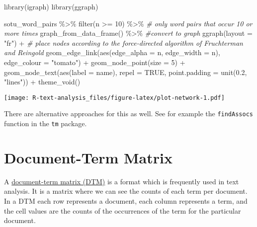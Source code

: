 \documentclass[
]{book}
\newenvironment{Shaded}{\begin{snugshade}}{\end{snugshade}}
\newcommand{\AttributeTok}[1]{\textcolor[rgb]{0.77,0.63,0.00}{#1}}
\newcommand{\CommentTok}[1]{\textcolor[rgb]{0.56,0.35,0.01}{\textit{#1}}}
\newcommand{\ConstantTok}[1]{\textcolor[rgb]{0.00,0.00,0.00}{#1}}
\newcommand{\DecValTok}[1]{\textcolor[rgb]{0.00,0.00,0.81}{#1}}
\newcommand{\FloatTok}[1]{\textcolor[rgb]{0.00,0.00,0.81}{#1}}
\newcommand{\FunctionTok}[1]{\textcolor[rgb]{0.00,0.00,0.00}{#1}}
\newcommand{\NormalTok}[1]{#1}
\newcommand{\SpecialCharTok}[1]{\textcolor[rgb]{0.00,0.00,0.00}{#1}}
\newcommand{\StringTok}[1]{\textcolor[rgb]{0.31,0.60,0.02}{#1}}
\begin{document}
\begin{Shaded}
\begin{Highlighting}[]
\FunctionTok{library}\NormalTok{(igraph)}
\FunctionTok{library}\NormalTok{(ggraph)}

\NormalTok{sotu\_word\_pairs }\SpecialCharTok{\%\textgreater{}\%} 
  \FunctionTok{filter}\NormalTok{(n }\SpecialCharTok{\textgreater{}=} \DecValTok{10}\NormalTok{) }\SpecialCharTok{\%\textgreater{}\%}  \CommentTok{\# only word pairs that occur 10 or more times}
  \FunctionTok{graph\_from\_data\_frame}\NormalTok{() }\SpecialCharTok{\%\textgreater{}\%} \CommentTok{\#convert to graph}
  \FunctionTok{ggraph}\NormalTok{(}\AttributeTok{layout =} \StringTok{"fr"}\NormalTok{) }\SpecialCharTok{+} \CommentTok{\# place nodes according to the force{-}directed algorithm of Fruchterman and Reingold}
  \FunctionTok{geom\_edge\_link}\NormalTok{(}\FunctionTok{aes}\NormalTok{(}\AttributeTok{edge\_alpha =}\NormalTok{ n, }\AttributeTok{edge\_width =}\NormalTok{ n), }\AttributeTok{edge\_colour =} \StringTok{"tomato"}\NormalTok{) }\SpecialCharTok{+}
  \FunctionTok{geom\_node\_point}\NormalTok{(}\AttributeTok{size =} \DecValTok{5}\NormalTok{) }\SpecialCharTok{+}
  \FunctionTok{geom\_node\_text}\NormalTok{(}\FunctionTok{aes}\NormalTok{(}\AttributeTok{label =}\NormalTok{ name), }\AttributeTok{repel =} \ConstantTok{TRUE}\NormalTok{, }
                 \AttributeTok{point.padding =} \FunctionTok{unit}\NormalTok{(}\FloatTok{0.2}\NormalTok{, }\StringTok{"lines"}\NormalTok{)) }\SpecialCharTok{+}
  \FunctionTok{theme\_void}\NormalTok{()}
\end{Highlighting}
\end{Shaded}

\texttt{[image: R-text-analysis\_files/figure-latex/plot-network-1.pdf]}

There are alternative approaches for this as well. See for example the \texttt{findAssocs} function in the \texttt{tm} package.

\hypertarget{document-term-matrix}{%
\section{Document-Term Matrix}\label{document-term-matrix}}

A \href{https://en.wikipedia.org/wiki/Document-term_matrix}{document-term matrix (DTM)} is a format which is frequently used in text analysis. It is a matrix where we can see the counts of each term per document. In a DTM each row represents a document, each column represents a term, and the cell values are the counts of the occurrences of the term for the particular document.
\end{document}
